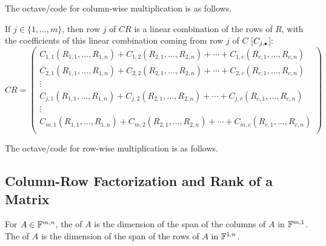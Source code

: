 \begin{thm}
\begin{minipage}{\linewidth}
  The octave\-/code for column-wise multiplication is as follows.

\end{minipage}

   If $j\in \{1, \ldots, m\}$, then row $j$ of $CR$ is a linear combination of the rows of $R$, with the coefficients of this linear combination coming from row $j$ of $C$ [$C_{j,\mathsmaller{\bullet}}$]:
  \begin{equation}
    CR =
    \left(
      \begin{matrix}
        C_{1,1} (R_{1,1}, \ldots, R_{1,n}) + C_{1,2} (R_{2,1}, \ldots, R_{2,n}) + \cdots + C_{1,c} (R_{c,1}, \ldots, R_{c,n}) \\
        C_{2,1} (R_{1,1}, \ldots, R_{1,n}) + C_{2,2} (R_{2,1}, \ldots, R_{2,n}) + \cdots + C_{2,c} (R_{c,1}, \ldots, R_{c,n}) \\
        \vdots \\
        C_{j,1} (R_{1,1}, \ldots, R_{1,n}) + C_{j,2} (R_{2,1}, \ldots, R_{2,n}) + \cdots + C_{j,c} (R_{c,1}, \ldots, R_{c,n}) \\
        \vdots \\
        C_{m,1} (R_{1,1}, \ldots, R_{1,n}) + C_{m,2} (R_{2,1}, \ldots, R_{2,n}) + \cdots + C_{m,c} (R_{c,1}, \ldots, R_{c,n}) \\
      \end{matrix}
    \right)
  \end{equation}

  \begin{minipage}{\linewidth}
    The octave\-/code for row-wise multiplication is as follows.

  \end{minipage}

\end{thm}

\subsection{Column-Row Factorization and Rank of a Matrix}

\setcounter{thm}{51}
\begin{mydef}
  For $A \in \mathbb{F}^{m,n}$, the  of $A$ is the dimension of the span of the columns of $A$ in $\mathbb{F}^{m,1}$. The  of $A$ is the dimension of the span of the rows of $A$ in $\mathbb{F}^{1,n}$.
\end{mydef}

